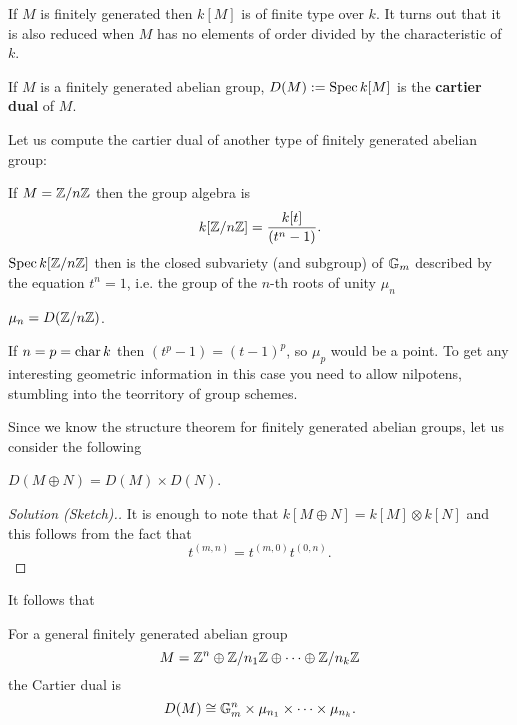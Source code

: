 \begin{remark}
If $M$ is finitely generated then $k[M]$ is of finite type over $k$. It turns out that it is also reduced when $M$ has no elements of order divided by the characteristic of $k$. 
\end{remark}


\begin{definition}
If $M$ is a finitely generated abelian group, $D(M):=\operatorname{Spec} k[M]$ is the \textbf{cartier dual} of $M$.
\end{definition}

Let us compute the cartier dual of another type of finitely generated abelian group:
\begin{example}
If $M={\mathbb{Z}/{n}\mathbb{Z}}$ then the group algebra is
\[k[{\mathbb{Z}/{n}\mathbb{Z}}]=\frac{k[t]}{(t^n-1)}.\]
$\operatorname{Spec} k[{\mathbb{Z}/{n}\mathbb{Z}}]$ then is the closed subvariety (and subgroup) of $\mathbb{G}_m$ described by the equation $t^n=1$, i.e. the group of the $n$-th roots of unity $\mu_n$
\end{example}

\begin{definition}
$\mu_n=D({\mathbb{Z}/{n}\mathbb{Z}})$.
\end{definition}

\begin{remark}
If $n=p=\operatorname{char} k$ then $(t^p-1)=(t-1)^p$, so $\mu_p$ would be a point. To get any interesting geometric information in this case you need to allow nilpotens, stumbling into the teorritory of group schemes.
\end{remark}

Since we know the structure theorem for finitely generated abelian groups, let us consider the following

\begin{exercise}
$D(M\oplus N)=D(M)\times D(N)$.
\end{exercise}
\begin{proof}[Solution (Sketch).]
It is enough to note that $k[M\oplus N]=k[M]\otimes k[N]$ and this follows from the fact that
\[t^{(m,n)}=t^{(m,0)}t^{(0,n)}.\]
\end{proof}

It follows that 

\begin{proposition}\label{PrCartierDualOfGeneralFinitelyGeneratedAbelianGroup}
For a general finitely generated abelian group
\[M=\mathbb{Z}^n\oplus {\mathbb{Z}/{n_1}\mathbb{Z}}\oplus\cdots\oplus {\mathbb{Z}/{n_k}\mathbb{Z}}\]
the Cartier dual is
\[D(M)\cong \mathbb{G}_m^n\times\mu_{n_1}\times\cdots\times\mu_{n_k}.\]
\end{proposition}


